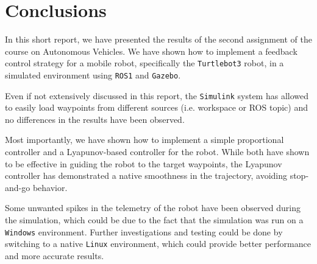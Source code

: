 \section{Conclusions}
\label{sec:conclusions}

In this short report, we have presented the results of the second assignment of the course on Autonomous Vehicles.
We have shown how to implement a feedback control strategy for a mobile robot, specifically the \texttt{Turtlebot3} robot, in a simulated environment using \texttt{ROS1} and \texttt{Gazebo}.

Even if not extensively discussed in this report, the \texttt{Simulink} system has allowed to easily load waypoints from different sources (i.e. workspace or ROS topic) and no differences in the results have been observed.

Most importantly, we have shown how to implement a simple proportional controller and a Lyapunov-based controller for the robot.
While both have shown to be effective in guiding the robot to the target waypoints, the Lyapunov controller has demonstrated a native smoothness in the trajectory, avoiding stop-and-go behavior.

Some unwanted spikes in the telemetry of the robot have been observed during the simulation, which could be due to the fact that the simulation was run on a \texttt{Windows} environment.
Further investigations and testing could be done by switching to a native \texttt{Linux} environment, which could provide better performance and more accurate results.